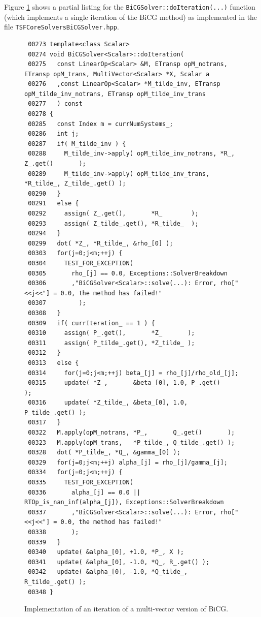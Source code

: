 Figure {}\ref{tsfcore:fig:BiCG_code} shows a partial listing for the
{}\texttt{BiCGSolver\-::doIteration(...)} function (which implements a
single iteration of the BiCG method) as implemented in the file
{}\texttt{TSFCore\-Solvers\-BiCG\-Solver.hpp}.
%
{\bsinglespace
\begin{figure}
\begin{minipage}{\textwidth}
{\scriptsize\begin{verbatim}
 00273 template<class Scalar>
 00274 void BiCGSolver<Scalar>::doIteration(
 00275   const LinearOp<Scalar> &M, ETransp opM_notrans, ETransp opM_trans, MultiVector<Scalar> *X, Scalar a
 00276   ,const LinearOp<Scalar> *M_tilde_inv, ETransp opM_tilde_inv_notrans, ETransp opM_tilde_inv_trans
 00277   ) const
 00278 {
 00285   const Index m = currNumSystems_;
 00286   int j;
 00287   if( M_tilde_inv ) {
 00288     M_tilde_inv->apply( opM_tilde_inv_notrans, *R_,       Z_.get()       );
 00289     M_tilde_inv->apply( opM_tilde_inv_trans,   *R_tilde_, Z_tilde_.get() );
 00290   }
 00291   else {
 00292     assign( Z_.get(),       *R_        );
 00293     assign( Z_tilde_.get(), *R_tilde_  );
 00294   }
 00299   dot( *Z_, *R_tilde_, &rho_[0] );
 00303   for(j=0;j<m;++j) {
 00304     TEST_FOR_EXCEPTION(
 00305       rho_[j] == 0.0, Exceptions::SolverBreakdown
 00306       ,"BiCGSolver<Scalar>::solve(...): Error, rho["<<j<<"] = 0.0, the method has failed!"
 00307         );
 00308   }
 00309   if( currIteration_ == 1 ) {
 00310     assign( P_.get(),       *Z_       );
 00311     assign( P_tilde_.get(), *Z_tilde_ );
 00312   }
 00313   else {
 00314     for(j=0;j<m;++j) beta_[j] = rho_[j]/rho_old_[j];
 00315     update( *Z_,       &beta_[0], 1.0, P_.get()       );
 00316     update( *Z_tilde_, &beta_[0], 1.0, P_tilde_.get() );
 00317   }
 00322   M.apply(opM_notrans, *P_,       Q_.get()       );
 00323   M.apply(opM_trans,   *P_tilde_, Q_tilde_.get() );
 00328   dot( *P_tilde_, *Q_, &gamma_[0] );
 00329   for(j=0;j<m;++j) alpha_[j] = rho_[j]/gamma_[j];
 00334   for(j=0;j<m;++j) {
 00335     TEST_FOR_EXCEPTION(
 00336       alpha_[j] == 0.0 || RTOp_is_nan_inf(alpha_[j]), Exceptions::SolverBreakdown
 00337       ,"BiCGSolver<Scalar>::solve(...): Error, rho["<<j<<"] = 0.0, the method has failed!"
 00338       );
 00339   }
 00340   update( &alpha_[0], +1.0, *P_, X );
 00341   update( &alpha_[0], -1.0, *Q_, R_.get() );
 00342   update( &alpha_[0], -1.0, *Q_tilde_, R_tilde_.get() );
 00348 }
\end{verbatim}}
\end{minipage}
\caption{
\label{tsfcore:fig:BiCG_code}
Implementation of an iteration of a multi-vector version of BiCG.
}
\end{figure}
\esinglespace}
